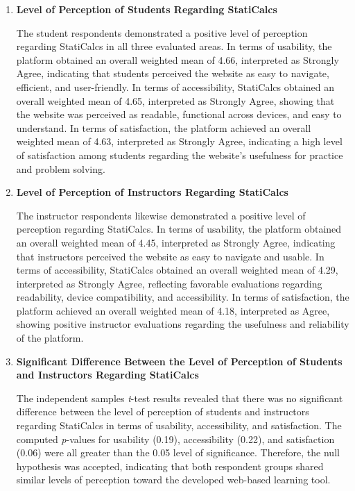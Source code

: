 \begin{enumerate}
    \item \textbf{Level of Perception of Students Regarding StatiCalcs}

    The student respondents demonstrated a positive level of perception regarding StatiCalcs in all three evaluated areas. In terms of usability, the platform obtained an overall weighted mean of 4.66, interpreted as Strongly Agree, indicating that students perceived the website as easy to navigate, efficient, and user-friendly. In terms of accessibility, StatiCalcs obtained an overall weighted mean of 4.65, interpreted as Strongly Agree, showing that the website was perceived as readable, functional across devices, and easy to understand. In terms of satisfaction, the platform achieved an overall weighted mean of 4.63, interpreted as Strongly Agree, indicating a high level of satisfaction among students regarding the website’s usefulness for practice and problem solving.

    \item \textbf{Level of Perception of Instructors Regarding StatiCalcs}

    The instructor respondents likewise demonstrated a positive level of perception regarding StatiCalcs. In terms of usability, the platform obtained an overall weighted mean of 4.45, interpreted as Strongly Agree, indicating that instructors perceived the website as easy to navigate and usable. In terms of accessibility, StatiCalcs obtained an overall weighted mean of 4.29, interpreted as Strongly Agree, reflecting favorable evaluations regarding readability, device compatibility, and accessibility. In terms of satisfaction, the platform achieved an overall weighted mean of 4.18, interpreted as Agree, showing positive instructor evaluations regarding the usefulness and reliability of the platform.

    \item \textbf{Significant Difference Between the Level of Perception of Students and Instructors Regarding StatiCalcs}

    The independent samples \textit{t}-test results revealed that there was no significant difference between the level of perception of students and instructors regarding StatiCalcs in terms of usability, accessibility, and satisfaction. The computed \textit{p}-values for usability (0.19), accessibility (0.22), and satisfaction (0.06) were all greater than the 0.05 level of significance. Therefore, the null hypothesis was accepted, indicating that both respondent groups shared similar levels of perception toward the developed web-based learning tool.


\end{enumerate}
